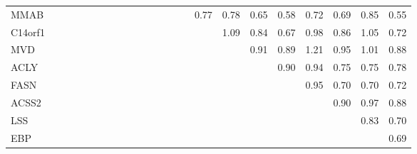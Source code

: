 \begin{longtable}{lrrrrrrrrrrrrrrrrrrrrrr}
MMAB    &            &             &              &             &              &             &              &             &            &            &           &             &           &            &          0.77 &      0.78 &       0.65 &       0.58 &        0.72 &      0.69 &      0.85 &         0.55 \\
C14orf1 &            &             &              &             &              &             &              &             &            &            &           &             &           &            &               &      1.09 &       0.84 &       0.67 &        0.98 &      0.86 &      1.05 &         0.72 \\
MVD     &            &             &              &             &              &             &              &             &            &            &           &             &           &            &               &           &       0.91 &       0.89 &        1.21 &      0.95 &      1.01 &         0.88 \\
ACLY    &            &             &              &             &              &             &              &             &            &            &           &             &           &            &               &           &            &       0.90 &        0.94 &      0.75 &      0.75 &         0.78 \\
FASN    &            &             &              &             &              &             &              &             &            &            &           &             &           &            &               &           &            &            &        0.95 &      0.70 &      0.70 &         0.72 \\
ACSS2   &            &             &              &             &              &             &              &             &            &            &           &             &           &            &               &           &            &            &             &      0.90 &      0.97 &         0.88 \\
LSS     &            &             &              &             &              &             &              &             &            &            &           &             &           &            &               &           &            &            &             &           &      0.83 &         0.70 \\
EBP     &            &             &              &             &              &             &              &             &            &            &           &             &           &            &               &           &            &            &             &           &           &         0.69 \\
\end{longtable}


